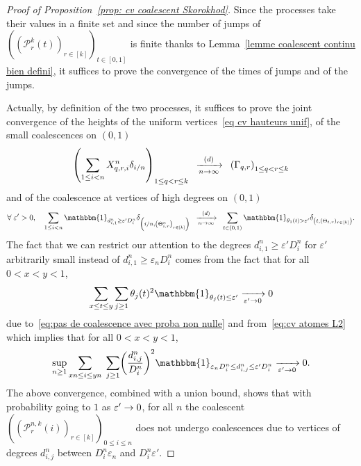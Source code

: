 \documentclass[AHL,Unicode,published]{cedram}
\newcommand{\e}{\varepsilon}
\newcommand{\cvloi}[1][n]{\enskip\xrightarrow[#1 \to \infty]{(d)}\enskip}
\newcommand{\1}{\mathbbm{1}}
\newcommand{\Part}{\mathcal{P}}
\let\originalleft\left
\let\originalright\right
\renewcommand{\left}{\mathopen{}\mathclose\bgroup\originalleft}
\renewcommand{\right}{\aftergroup\egroup\originalright}
\renewcommand*{\to}{\mathchoice{\longrightarrow}{\rightarrow}{\rightarrow}{\rightarrow}}
\let\oldforall\forall
\renewcommand*{\forall}{\mathrel{\oldforall}}
\begin{document}
\begin{proof}[Proof of Proposition~\ref{prop: cv coalescent Skorokhod}]
Since the processes take their values in a finite set and since the number of jumps of $((\Part^k_r(t))_{r \in [k]})_{t \in [0,1]}$ is finite {thanks to Lemma~\ref{lemme coalescent continu bien defini}}, it suffices to prove the convergence of the times of jumps and of the jumps.

Actually, by definition of the two processes, it suffices to prove the joint convergence of the heights of the uniform vertices~\eqref{eq cv hauteurs unif}, of the small coalescences on $(0,1)$
\begin{equation}\label{eq cv petites coalescences}
\left(\sum_{ 1\le i < n}X^n_{q,r,i} \delta_{i/n}\right)_{1 \le q<r \le k}\cvloi[n] \left(\Gamma_{q,r}\right)_{1 \le q<r\le k}
\end{equation}
and of the coalescence at vertices of high degrees on $(0,1)$
\begin{equation}\label{eq cv grandes coalescences}
\forall \e' >0,\quad \sum_{1\le i < n} \1_{d^n_{i,1} \ge \e' D^n_i} \delta_{\left(i/n, \left(\Theta^n_{i,r}\right)_{r\in [k]}\right)}\cvloi[n] \sum_{t \in (0,1)} \1_{\theta_1(t)>\e'} \delta_{\left(t,(\Theta_{t,r})_{r \in [k]}\right)}.
\end{equation}
The fact that we can restrict our attention to the degrees $d^n_{i,1} \ge \e' D^n_i$ for $\e'$ arbitrarily small instead of $d^n_{i,1} \ge \e_n D^n_i$ comes from the fact that for all $0<x<y<1$,
\[
\sum_{x\le t\le y} \sum_{j\ge 1} \theta_j(t)^2 \1_{\theta_j(t)\le \e'} \xrightarrow[\e' \to 0]{} 0
\]
due to~\eqref{eq:pas de coalescence avec proba non nulle} and from~\eqref{eq:cv atomes L2} which implies that for all $0<x<y<1$,
\[
\sup_{n\ge 1} \sum_{xn \le i \le yn}\; \sum_{j\ge 1} \left(\frac{d^n_{i,j}}{D^n_i}\right)^2 \1_{\e_n D^n_i \le d^n_{i,j} \le \e' D^n_i} \xrightarrow[\e' \to 0]{} 0.
\]
The above convergence, combined with a union bound, shows that with probability going to $1$ as $\e'\to 0$, for all $n$ the coalescent $((\Part^{n,k}_r(i))_{r \in [k]})_{0\le i \le n}$ does not undergo coalescences due to vertices of degrees $d^n_{i,j}$ between $D^n_i\e_n$ and $D^n_i \e'$.



\end{proof}
\end{document}
